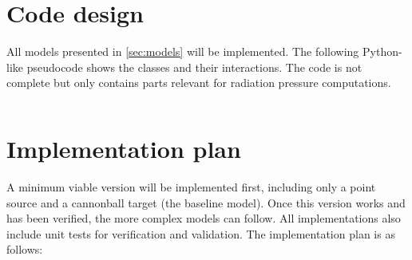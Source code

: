 \documentclass[parskip=full,DIV=15]{scrartcl}
\begin{document}
\section{Code design}
All models presented in \cref{sec:models} will be implemented. The following Python-like pseudocode shows the classes and their interactions. The code is not complete but only contains parts relevant for radiation pressure computations.

\inputminted{python}{code_design.py}







\section{Implementation plan}
A minimum viable version will be implemented first, including only a point source and a cannonball target (the baseline model). Once this version works and has been verified, the more complex models can follow. All implementations also include unit tests for verification and validation. The implementation plan is as follows:
\end{document}
